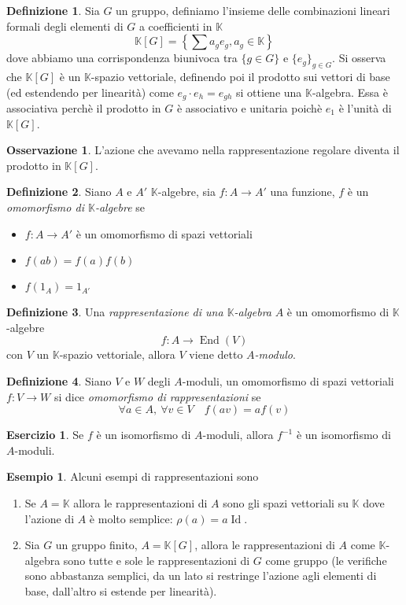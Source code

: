 \documentclass[11pt]{article}
\theoremstyle{plain}
\theoremstyle{definition}
\newtheorem{defn}{Definizione}[section]
\newtheorem{exmp}{Esempio}[section]
\newtheorem{exercise}{Esercizio}[section]
\newtheorem*{rem}{Osservazione}
\theoremstyle{remark}
\newcommand{\K}{\mathbb{K}}
\DeclareMathOperator{\End}{End}
\DeclareMathOperator{\Id}{Id}
\begin{document}
	\begin{defn}
		Sia $G$ un gruppo, definiamo l'insieme delle combinazioni lineari formali degli elementi di $G$ a coefficienti in $\K$
		\[
			\K[G] = \left\{ \sum a_g e_g, a_g\in \K \right\}
		\]
		dove abbiamo una corrispondenza biunivoca tra $\{ g\in G \}$ e $\{ e_g \}_{g\in G}$.
		Si osserva che $\K[G]$ è un $\K$-spazio vettoriale, definendo poi il prodotto sui vettori di base (ed estendendo per linearità) come $e_g\cdot e_h=e_{gh}$ si ottiene una $\K$-algebra. Essa è associativa perchè il prodotto in $G$ è associativo e unitaria poichè $e_1$ è l'unità di $\K[G]$.
	\end{defn}
	\begin{rem}
		L'azione che avevamo nella rappresentazione regolare diventa il prodotto in $\K[G]$.
	\end{rem}
	\begin{defn}
		Siano $A$ e $A'$ $\K$-algebre, sia $f:A\to A'$ una funzione, $f$ è un \textit{omomorfismo di $\K$-algebre} se
		\begin{itemize}
			\item $f:A\to A'$ è un omomorfismo di spazi vettoriali
			\item $f(ab)=f(a)f(b)$
			\item $f(1_A)=1_{A'}$
		\end{itemize}
	\end{defn}
	\begin{defn}
		Una \textit{rappresentazione di una $\K$-algebra} $A$ è un omomorfismo di $\K$-algebre
		\[ f:A\to \End(V)\]
		con $V$ un $\K$-spazio vettoriale, allora $V$ viene detto $A$\textit{-modulo}.
	\end{defn}
	\begin{defn}
		Siano $V$ e $W$ degli $A$-moduli, un omomorfismo di spazi vettoriali $f:V\to W$ si dice \textit{omomorfismo di rappresentazioni} se
		\[\forall a\in A,\ \forall v\in V \quad f(av)=af(v)\]
	\end{defn}
	\begin{exercise}
		Se $f$ è un isomorfismo di $A$-moduli, allora $f^{-1}$ è un isomorfismo di $A$-moduli.
	\end{exercise}
	\begin{exmp}
		Alcuni esempi di rappresentazioni sono
		\begin{enumerate}
			\item Se $A=\K$ allora le rappresentazioni di $A$ sono gli spazi vettoriali su $\K$ dove l'azione di $A$ è molto semplice: $\rho(a) = a\Id$.
			\item Sia $G$ un gruppo finito, $A=\K[G]$, allora le rappresentazioni di $A$ come $\K$-algebra sono tutte e sole le rappresentazioni di $G$ come gruppo (le verifiche sono abbastanza semplici, da un lato si restringe l'azione agli elementi di base, dall'altro si estende per linearità).
		\end{enumerate}
	\end{exmp}
\end{document}
